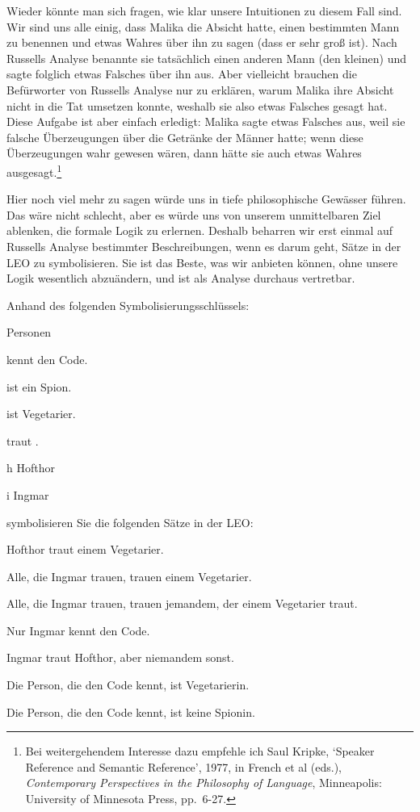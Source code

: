 Wieder könnte man sich fragen, wie klar unsere Intuitionen zu diesem Fall sind. Wir sind uns alle einig, dass Malika die Absicht hatte, einen bestimmten Mann zu benennen und etwas Wahres über ihn zu sagen (dass er sehr gro{\ss} ist). Nach Russells Analyse benannte sie tatsächlich einen anderen Mann (den kleinen) und sagte folglich etwas Falsches über ihn aus. Aber vielleicht brauchen die Befürworter von Russells Analyse nur zu erklären, warum Malika ihre Absicht nicht in die Tat umsetzen konnte, weshalb sie also etwas Falsches gesagt hat. Diese Aufgabe ist aber einfach erledigt: Malika sagte etwas Falsches aus, weil sie falsche Überzeugungen über die Getränke der Männer hatte; wenn diese Überzeugungen wahr gewesen wären, dann hätte sie auch etwas Wahres ausgesagt.\footnote{Bei weitergehendem Interesse dazu empfehle ich Saul Kripke, `Speaker Reference and Semantic Reference', 1977, in French et al (eds.), \emph{Contemporary Perspectives in the Philosophy of Language}, Minneapolis: University of Minnesota Press, pp.\ 6-27.}

Hier noch viel mehr zu sagen würde uns in tiefe philosophische Gewässer führen. Das wäre nicht schlecht, aber es würde uns von unserem unmittelbaren Ziel ablenken, die formale Logik zu erlernen. Deshalb beharren wir erst einmal auf Russells Analyse bestimmter Beschreibungen, wenn es darum geht, Sätze in der LEO zu symbolisieren. Sie ist das Beste, was wir anbieten können, ohne unsere Logik wesentlich abzuändern, und ist als Analyse durchaus vertretbar. 

\practiceproblems

\problempart
Anhand des folgenden Symbolisierungsschlüssels:
\begin{ekey}
\item[\text{Domäne}] Personen
\item[\atom{K}{x}]  kennt den Code.
\item[\atom{S}{x}]  ist ein Spion.
\item[\atom{V}{x}]  ist Vegetarier.
\item[\atom{T}{x,y}]  traut .
\item[h] Hofthor
\item[i] Ingmar
\end{ekey}
symbolisieren Sie die folgenden Sätze in der LEO:
\begin{earg}
\item Hofthor traut einem Vegetarier.
\item Alle, die Ingmar trauen, trauen einem Vegetarier.
\item Alle, die Ingmar trauen, trauen jemandem, der einem Vegetarier traut.
\item Nur Ingmar kennt den Code.
\item Ingmar traut Hofthor, aber niemandem sonst.
\item Die Person, die den Code kennt, ist Vegetarierin.
\item Die Person, die den Code kennt, ist keine Spionin.
\end{earg}

